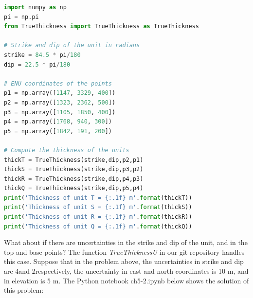 \documentclass[a4paper , 12pt]{book}
\begin{document}
\begin{center}
\begin{lstlisting}[language=Python, frame=single]
import numpy as np
pi = np.pi
from TrueThickness import TrueThickness as TrueThickness

# Strike and dip of the unit in radians
strike = 84.5 * pi/180
dip = 22.5 * pi/180

# ENU coordinates of the points
p1 = np.array([1147, 3329, 400]) 
p2 = np.array([1323, 2362, 500]) 
p3 = np.array([1105, 1850, 400]) 
p4 = np.array([1768, 940, 300]) 
p5 = np.array([1842, 191, 200])

# Compute the thickness of the units
thickT = TrueThickness(strike,dip,p2,p1)
thickS = TrueThickness(strike,dip,p3,p2)
thickR = TrueThickness(strike,dip,p4,p3)
thickQ = TrueThickness(strike,dip,p5,p4)
print('Thickness of unit T = {:.1f} m'.format(thickT))
print('Thickness of unit S = {:.1f} m'.format(thickS))
print('Thickness of unit R = {:.1f} m'.format(thickR))
print('Thickness of unit Q = {:.1f} m'.format(thickQ))
\end{lstlisting}
\end{center}

What about if there are uncertainties in the strike and dip of the unit, and in the top and base points? The function \textit{TrueThicknessU} in our git repository handles this case. Suppose that in the problem above, the uncertainties in strike and dip are 4\degree and 2\degree respectively, the uncertainty in east and north coordinates is 10 m, and in elevation is 5 m. The Python notebook ch5-2.ipynb below shows the solution of this problem:
\end{document}
